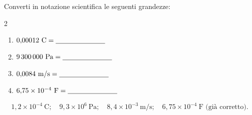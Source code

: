 \begin{question}[ID=1.3, subtitle={Notazione scientifica con unità variegate}, tags={notazione scientifica}, difficulty=media]
Converti in notazione scientifica le seguenti grandezze:
\begin{center}\begin{minipage}{0.92\linewidth}
\begin{multicols}{2}
\begin{enumerate}
\item $0{,}00012\ \text{C} = \underline{\hspace{2.5cm}}$
\item $9\,300\,000\ \text{Pa} = \underline{\hspace{2.5cm}}$
\item $0{,}0084\ \text{m/s} = \underline{\hspace{2.5cm}}$
\item $6{,}75\times 10^{-4}\ \text{F} = \underline{\hspace{2.5cm}}$
\end{enumerate}
\end{multicols}
\end{minipage}\end{center}
\begin{solution}
\[
1{,}2\times10^{-4}\ \text{C};\quad 9{,}3\times10^{6}\ \text{Pa};\quad 8{,}4\times10^{-3}\ \text{m/s};\quad 6{,}75\times10^{-4}\ \text{F} \text{ (già corretto)}.
\]
\end{solution}
\end{question}


